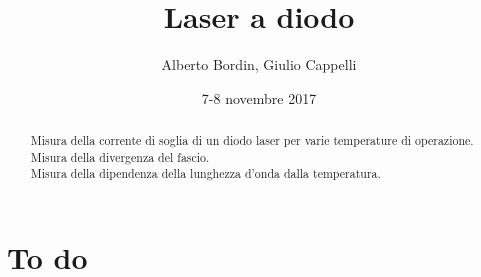\documentclass[a4paper]{article}
\author{Alberto Bordin, Giulio Cappelli}
\title{Laser a diodo}
\date{7-8 novembre 2017}
\begin{document}
	\maketitle
	
\begin{abstract}
	Misura della corrente di soglia di un diodo laser per varie temperature di operazione. \\
	Misura della divergenza del fascio. \\
	Misura della dipendenza della lunghezza d'onda dalla temperatura. \\
\end{abstract}

\section{To do}
\end{document}
